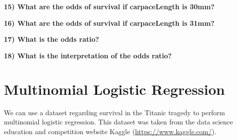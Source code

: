\documentclass{article}\usepackage[]{graphicx}\usepackage[]{color}
\begin{document}
\vspace{20mm}

\textbf{15) What are the odds of survival if carpaceLength is 30mm?}

\vspace{20mm}

\textbf{16) What are the odds of survival if carpaceLength is 31mm?}

\vspace{20mm}

\textbf{17) What is the odds ratio?}

\vspace{20mm}

\textbf{18) What is the interpretation of the odds ratio?}

\newpage

\section{Multinomial Logistic Regression}

We can use a dataset regarding survival in the Titanic tragedy to perform multinomial logistic regression. This dataset was taken from the data science education and competition website Kaggle (\url{https://www.kaggle.com/}).
\end{document}
